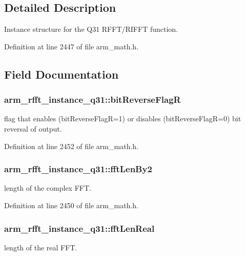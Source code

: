 \subsection{Detailed Description}
Instance structure for the Q31 R\-F\-F\-T/\-R\-I\-F\-F\-T function. 

Definition at line 2447 of file arm\-\_\-math.\-h.



\subsection{Field Documentation}
\hypertarget{structarm__rfft__instance__q31_a3cb90cdc928a88b0203917dcb3dc1b71}{
\subsubsection[{bit\-Reverse\-Flag\-R}]{ arm\-\_\-rfft\-\_\-instance\-\_\-q31\-::bit\-Reverse\-Flag\-R}}\label{structarm__rfft__instance__q31_a3cb90cdc928a88b0203917dcb3dc1b71}
flag that enables (bit\-Reverse\-Flag\-R=1) or disables (bit\-Reverse\-Flag\-R=0) bit reversal of output. 

Definition at line 2452 of file arm\-\_\-math.\-h.

\hypertarget{structarm__rfft__instance__q31_a7d1a948bb8a23bf5419bb6f9ef43dd76}{
\subsubsection[{fft\-Len\-By2}]{ arm\-\_\-rfft\-\_\-instance\-\_\-q31\-::fft\-Len\-By2}}\label{structarm__rfft__instance__q31_a7d1a948bb8a23bf5419bb6f9ef43dd76}
length of the complex F\-F\-T. 

Definition at line 2450 of file arm\-\_\-math.\-h.

\hypertarget{structarm__rfft__instance__q31_af777b0cadd5abaf064323692c2e6693b}{
\subsubsection[{fft\-Len\-Real}]{ arm\-\_\-rfft\-\_\-instance\-\_\-q31\-::fft\-Len\-Real}}\label{structarm__rfft__instance__q31_af777b0cadd5abaf064323692c2e6693b}
length of the real F\-F\-T. 

